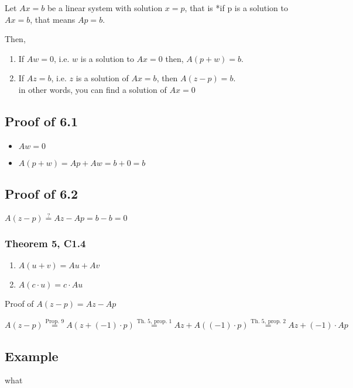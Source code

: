 \documentclass[12pt]{article}
\begin{document}
Let $Ax=b$ be a linear system with solution $x=p$, that is *if p is a solution
to $Ax=b$, that means $Ap=b$.

Then,

\begin{enumerate}
\item If $Aw=0$, i.e. $w$ is a solution to $Ax=0$ then, $A(p+w)=b$.
\item If $Az=b$, i.e. $z$ is a solution of $Ax=b$, then $A(z-p)=b$. \\
  in other words, you can find a solution of $Ax=0$
\end{enumerate}

\subsection*{Proof of 6.1}

\begin{itemize}
  \item $Aw=0$
  \item $A(p+w)=Ap+Aw=b+0=b$
\end{itemize}

\subsection*{Proof of 6.2}

$A(z-p) \stackrel{?}{=} Az-Ap = b-b = 0$

\subsubsection*{Theorem 5, C1.4}

\begin{enumerate}
  \item $A(u+v)=Au+Av$
  \item $A(c\cdot u)=c\cdot Au$
\end{enumerate}

Proof of $A(z-p) = Az-Ap$

$A(z-p) \stackrel{\text{Prop. }9}{=} A(z+(-1)\cdot p) \stackrel{\text{Th. 5, prop. }1}{=} 
Az+A((-1)\cdot p) \stackrel{\text{Th. 5, prop. }2}{=} Az+(-1)\cdot Ap$



\subsection*{Example}

what
\end{document}
